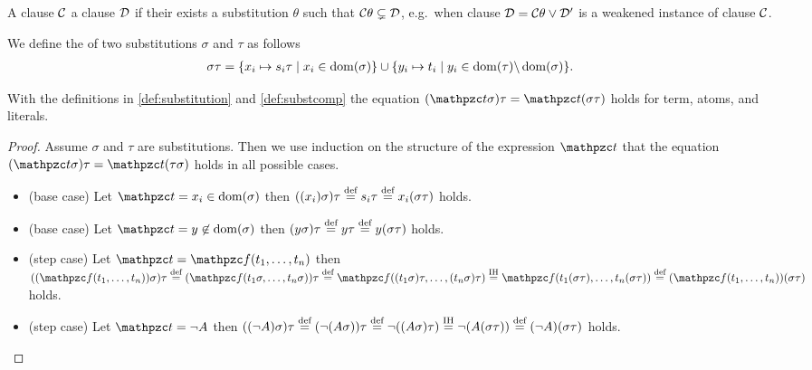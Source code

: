 \begin{definition}
	A clause $\mcC$  a clause $\mcD$ if their exists a substitution $\theta$ such that $\mcC\theta \subsetneq \mcD$,
	e.g.~when clause $\mcD = \mcC\theta \lor \mcD'$ is a weakened instance of clause $\mcC$.
\end{definition}

\begin{definition}\label{def:substcomp}
We define the  of two substitutions $\sigma$ and $\tau$ as follows
	\begin{align*}
		\sigma\tau&=\{ x_i\mapsto s_i\tau\mid x_i\in\domain(\sigma) \}
		\cup
		\{ y_i\mapsto t_i\mid y_i\in\domain(\tau) \backslash \domain(\sigma) \}.
	\end{align*}
\end{definition}

\begin{lemma}\label{lem:substitution}
	With the definitions in \ref{def:substitution} and \ref{def:substcomp} the equation
	$(\mct\sigma)\tau = \mct(\sigma\tau)$ holds for
	term, atoms, and literals.
\end{lemma}

\begin{proof}
	Assume $\sigma$ and $\tau$ are substitutions.
	Then we use induction on the structure of the 	expression $\mct$
	that the equation $(\mct\sigma)\tau =  \mct(\tau\sigma)$ holds in all possible cases.
	\begin{itemize}
		\item (base case) Let $\mct = x_i \in\domain(\sigma)$ then
		$((x_i)\sigma)\tau\defEQ s_i\tau\defEQ x_i(\sigma\tau)$ holds.

		\item (base case) Let $\mct = y \not\in\domain(\sigma)$ then
		$(y\sigma)\tau \defEQ y\tau \defEQ y(\sigma\tau)$ holds.

		\item (step case) Let $\mct = \mcf(t_1,\ldots,t_n)$
		then
		$((\mcf(t_1,\ldots,t_n))\sigma)\tau
		\defEQ
		(\mcf(t_1\sigma,\ldots,t_n\sigma))\tau
		\defEQ
		\mcf((t_1\sigma)\tau,\ldots,(t_n\sigma)\tau)
		\defEQ[IH]
		\mcf(t_1(\sigma\tau),\ldots,t_n(\sigma\tau))
		\defEQ
		(\mcf(t_1,\ldots,t_n))(\sigma\tau)
		$ holds.

		\item (step case) Let $\mct = \lnot A$ then
		$((\lnot A)\sigma)\tau
		\defEQ
		(\lnot(A\sigma))\tau
		\defEQ
		\lnot((A\sigma)\tau)
		\defEQ[IH]
		\lnot(A(\sigma\tau))
		\defEQ
		(\lnot A)(\sigma\tau)
		$ holds.
	\end{itemize}
\end{proof}
